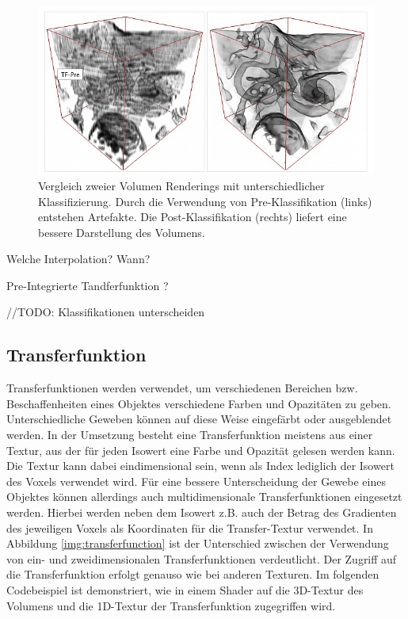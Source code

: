 \begin{figure}
	\centering
	\includegraphics[width=0.7\linewidth]{images/prepostclassification.png}
	\caption{Vergleich zweier Volumen Renderings mit unterschiedlicher Klassifizierung. Durch die Verwendung von Pre-Klassifikation (links) entstehen Artefakte. Die Post-Klassifikation (rechts) liefert eine bessere Darstellung des Volumens.}
	\label{img:repost}
\end{figure}

Welche Interpolation? Wann?

Pre-Integrierte Tandferfunktion ? 

//TODO:
Klassifikationen unterscheiden

\subsection{Transferfunktion}

Transferfunktionen werden verwendet, um verschiedenen Bereichen bzw. Beschaffenheiten eines Objektes verschiedene Farben und Opazitäten zu geben. Unterschiedliche Geweben können auf diese Weise eingefärbt oder ausgeblendet werden. In der Umsetzung besteht eine Transferfunktion meistens aus einer Textur, aus der für jeden Isowert eine Farbe und Opazität gelesen werden kann. Die Textur kann dabei eindimensional sein, wenn als Index lediglich der Isowert des Voxels verwendet wird. Für eine bessere Unterscheidung der Gewebe eines Objektes können allerdings auch multidimensionale Transferfunktionen eingesetzt werden. Hierbei werden neben dem Isowert z.B. auch der Betrag des Gradienten des jeweiligen Voxels als Koordinaten für die Transfer-Textur verwendet. In Abbildung \ref{img:transferfunction} ist der Unterschied zwischen der Verwendung von ein- und zweidimensionalen Transferfunktionen verdeutlicht. Der Zugriff auf die Transferfunktion erfolgt genauso wie bei anderen Texturen. Im folgenden Codebeispiel ist demonstriert, wie in einem Shader auf die 3D-Textur des Volumens und die 1D-Textur der Transferfunktion zugegriffen wird. \cite{Fernando04}

